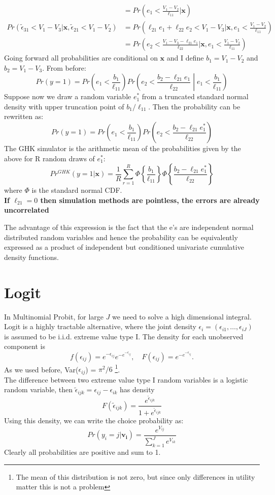 \documentclass[DIV=14,titlepage=false]{scrreprt}
\begin{document}
\begin{example}
\begin{align*}
        &= Pr(e_1 < \frac{V_1 - V_2}{\ell_{11}}|\mathbf{x}) \\
        Pr( \tilde \epsilon_{31} < V_1 - V_3 |\mathbf{x}, \tilde \epsilon_{21} < V_1 - V_2) &= Pr(\ell_{21}e_1 + \ell_{22}e_2 < V_1 - V_3|\mathbf{x}, e_1 < \frac{V_1 - V_2}{\ell_{11}}) \\
        &= Pr(e_2 < \frac{V_1 - V_3 - \ell_{21}e_1}{\ell_{22}}|\mathbf{x}, e_1 < \frac{V_1 - V_2}{\ell_{11}})
    \end{align*}
    Going forward all probabilities are conditional on $\mathbf{x}$ and I define $b_1 = V_1 - V_2$ and $b_2 = V_1 - V_3$. From before:
    \[
        Pr(y=1) = Pr\left(e_1 < \frac{b_1}{\ell_{11}}\right) Pr\left(e_2 < \frac{b_2 - \ell_{21}e_1}{\ell_{22}}\middle|e_1 < \frac{b_1}{\ell_{11}}\right) 
    \]
    Suppose now we draw a random variable $e^*_1$ from a truncated standard normal density with upper truncation point of $b_1/\ell_{11}$. Then the probability can be rewritten as:
    \[
        Pr(y=1) = Pr\left(e_1 < \frac{b_1}{\ell_{11}}\right) Pr\left(e_2 < \frac{b_2 - \ell_{21}e^*_1}{\ell_{22}}\right) 
    \]
    The GHK simulator is the arithmetic mean of the probabilities given by the above for R random draws of $e^*_1$:
    \[
        Pr^{GHK}(y=1|\mathbf{x}) = \frac{1}{R}\sum_{r=1}^R \Phi \left\{\frac{b_1}{\ell_{11}}\right\} \Phi \left\{\frac{b_2 - \ell_{21}e^*_1}{\ell_{22}}\right\}
    \]
    where $\Phi$ is the standard normal CDF.\\
    \textbf{If $\ell_{21} = 0$ then simulation methods are pointless, the errors are already uncorrelated}
\end{example}
The advantage of this expression is the fact that the e’s are independent normal distributed random variables and hence the probability can be equivalently expressed as a product of independent but conditioned univariate cumulative density functions.
\section{Logit}
In Multinomial Probit, for large $J$ we need to solve a high dimensional integral. Logit is a highly tractable alternative, where the joint density $\epsilon_i = (\epsilon_{i1}, \dots, \epsilon_{iJ})$ is assumed to be i.i.d. extreme value type I. The density for each unobserved component is 
\[
  f(\epsilon_{ij}) = e^{-\epsilon_{ij}}e^{-e^{-\epsilon_{ij}}},
\quad
  F(\epsilon_{ij}) = e^{-e^{-\epsilon_{ij}}}.
\]
As we used before, Var($\epsilon_{ij}$) = $\pi^2/6$ \footnote{The mean of this distribution is not zero, but since only differences in utility matter this is not a problem}.\\
The difference between two extreme value type I random variables is a logistic random variable, then $\tilde \epsilon_{ijk} = \epsilon_{ij} - \epsilon_{ik}$ has density
\[
    F(\tilde \epsilon_{ijk}) = \frac{e^{\tilde \epsilon_{ijk}}}{1 + e^{\tilde \epsilon_{ijk}}}
\]
Using this density, we can write the choice probability as:
\[
    Pr(y_i = j | \mathbf{v_i}) = \frac{e^{V_{ij}}}{\sum_{k=1}^J e^{V_{ik}}}
\]
Clearly all probabilities are positive and sum to 1.
\end{document}
